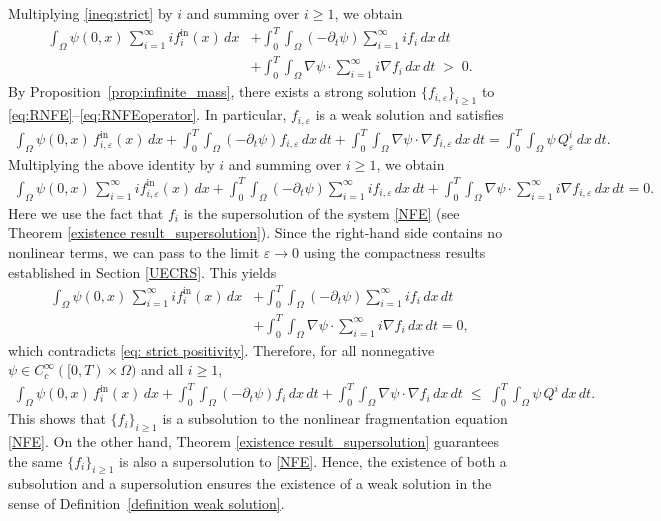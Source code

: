 \documentclass[a4paper,12pt,reqno]{amsart}
\theoremstyle{plain}
\numberwithin{equation}{section}
\begin{document}
	Multiplying \eqref{ineq:strict} by $i$ and summing over $i\ge 1$, we obtain
	\begin{align}\label{eq: strict positivity}
		\int_\Omega
		\psi(0,x)\,
		\sum_{i=1}^\infty i f_i^{\mathrm{in}}(x)\,dx
		&+
		\int_0^T \int_\Omega
		\left(-\partial_t \psi\right)
		\sum_{i=1}^\infty i f_i
		\,dx\,dt \nonumber\\
		&+
		\int_0^T \int_\Omega
		\nabla \psi \cdot
		\sum_{i=1}^\infty i \nabla f_i
		\,dx\,dt
		\;>\; 0 .
	\end{align}
	By Proposition~\ref{prop:infinite_mass}, there exists a strong solution
	$\{f_{i,\varepsilon}\}_{i\ge 1}$ to
	\eqref{eq:RNFE}–\eqref{eq:RNFEoperator}.
	In particular, $f_{i,\varepsilon}$ is a weak solution and satisfies
	\begin{align*}
		\int_\Omega
		\psi(0,x)\, f_{i,\varepsilon}^{\mathrm{in}}(x)\,dx
		+
		\int_0^T \int_\Omega
		\left(-\partial_t \psi\right)
		f_{i,\varepsilon}
		\,dx\,dt
		+
		\int_0^T \int_\Omega
		\nabla \psi \cdot
		\nabla f_{i,\varepsilon}
		\,dx\,dt
		=
		\int_0^T \int_\Omega
		\psi\, Q_\varepsilon^i
		\,dx\,dt .
	\end{align*}
	Multiplying the above identity by $i$ and summing over $i\ge 1$, we obtain
	\begin{align*}
		\int_\Omega
		\psi(0,x)\,
		\sum_{i=1}^{\infty} i f_{i,\varepsilon}^{\mathrm{in}}(x)\,dx
		+
		\int_0^T \int_\Omega
		\left(-\partial_t \psi\right)
		\sum_{i=1}^{\infty} i f_{i,\varepsilon}
		\,dx\,dt +
		\int_0^T \int_\Omega
		\nabla \psi \cdot
		\sum_{i=1}^{\infty} i \nabla f_{i,\varepsilon}
		\,dx\,dt
		= 0 .
	\end{align*}
	Here we use the fact that $f_i$ is the supersolution of the system \eqref{NFE} (see Theorem \ref{existence result_supersolution}). Since the right-hand side contains no nonlinear terms, we can pass to the limit
	$\varepsilon \to 0$ using the compactness results established in Section \ref{UECRS}.
	This yields
	\begin{align*}
		\int_\Omega
		\psi(0,x)\,
		\sum_{i=1}^{\infty} i f_i^{\mathrm{in}}(x)\,dx
		&+
		\int_0^T \int_\Omega
		\left(-\partial_t \psi\right)
		\sum_{i=1}^{\infty} i f_i
		\,dx\,dt \\
		&+
		\int_0^T \int_\Omega
		\nabla \psi \cdot
		\sum_{i=1}^{\infty} i \nabla f_i
		\,dx\,dt
		= 0 ,
	\end{align*}
	which contradicts \eqref{eq: strict positivity}. Therefore, for all nonnegative
	$\psi \in C_c^\infty([0,T)\times \Omega)$ and all $i\ge 1$,
	\begin{align*}
		\int_\Omega
		\psi(0,x)\, f_i^{\mathrm{in}}(x)\,dx
		+
		\int_0^T \int_\Omega
		\left(-\partial_t \psi\right) f_i
		\,dx\,dt
		+
		\int_0^T \int_\Omega
		\nabla \psi \cdot \nabla f_i
		\,dx\,dt
		\;\le\;
		\int_0^T \int_\Omega
		\psi\, Q^i
		\,dx\,dt .
	\end{align*}
	This shows that $\{f_i\}_{i\ge 1}$ is a subsolution to the nonlinear fragmentation equation \eqref{NFE}.
	On the other hand, Theorem \ref{existence result_supersolution} guarantees the same $\{f_i\}_{i\ge 1}$ is also a supersolution to \eqref{NFE}.
	Hence, the existence of both a subsolution and a supersolution ensures the existence of a weak solution
	in the sense of Definition~\ref{definition weak solution}.
	
\end{document}
